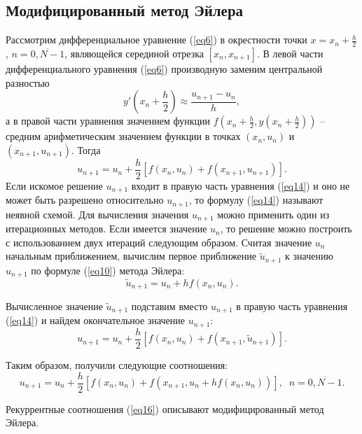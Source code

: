 \documentclass[
11pt,
master, %
subf, %
href, %
colorlinks=true, %
times, %
]{disser}
\begin{document}
\subsection{Модифицированный метод Эйлера}
Рассмотрим дифференциальное уравнение (\ref{eq6}) в окрестности точки $x = x_n +\frac{h}{2}$, $n = \overline{0,N-1}$, являющейся серединой отрезка $[x_n ,x_{n+1}]$. В левой части дифференциального уравнения (\ref{eq6}) производную заменим центральной разностью
$$y'\left(x_n + \frac{h}{2}\right) \approx \frac{u_{n+1}-u_n}{h},$$
а в правой части уравнения значением функции $f\left(x_n + \frac{h}{2}, y(x_n + \frac{h}{2})\right)$ -- средним арифметическим значением функции в точках $(x_n, u_n)$ и $(x_{n+1}, u_{n+1})$. Тогда
\begin{equation}\label{eq14}
  u_{n+1} = u_n + \frac{h}{2}[f(x_n, u_n) + f(x_{n+1}, u_{n+1})].
\end{equation}
Если искомое решение $u_{n+1}$ входит в правую часть уравнения (\ref{eq14}) и оно не может быть разрешено относительно $u_{n+1}$, то формулу (\ref{eq14}) называют неявной схемой. Для вычисления значения $u_{n+1}$ можно применить один из итерационных методов. Если имеется значение $u_n$, то решение можно построить с использованием двух итераций следующим образом. Считая значение $u_n$ начальным приближением, вычислим первое приближение $\tilde{u}_{n+1}$ к значению $u_{n+1}$ по формуле (\ref{eq10}) метода Эйлера:
\begin{equation}\label{eq15}
  \tilde{u}_{n+1} = u_n + h f(x_n, u_n).
\end{equation}

Вычисленное значение $\tilde{u}_{n+1}$ подставим вместо $u_{n+1}$ в правую часть уравнения (\ref{eq14}) и найдем окончательное значение $u_{n+1}$:
\begin{equation}\label{eq16}
  u_{n+1} = u_n + \frac{h}{2}[f(x_n, u_n) + f(x_{n+1}, \tilde{u}_{n+1})].
\end{equation}

Таким образом, получили следующие соотношения:
\begin{equation}\label{eq17}
  u_{n+1} = u_n + \frac{h}{2}[f(x_n, u_n) + f(x_{n+1}, u_n + h f(x_n, u_n))],\;\;n=\overline{0,N-1}.
\end{equation}

Рекуррентные соотношения (\ref{eq16}) описывают модифицированный метод Эйлера.
\end{document}
